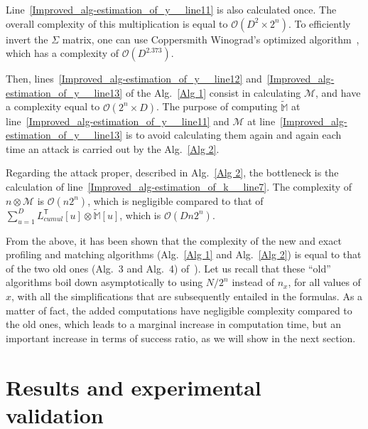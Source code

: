 \documentclass[conference,twocolumn]{IEEEtran}
\begin{document}
Line~\ref{Improved_alg-estimation_of_y__line11} is also calculated once. The overall complexity of this multiplication is equal to $ \mathcal{O} (D^2 \times 2^n)$. 
To efficiently invert the $\Sigma$ matrix, one can use Coppersmith Winograd's optimized algorithm~\cite{karloff2012proceedings}, which has a complexity of $\mathcal{O} (D^{2.373})$. %

Then, lines~\ref{Improved_alg-estimation_of_y__line12} and~\ref{Improved_alg-estimation_of_y__line13} of the Alg.~\ref{Alg 1} consist in calculating $\mathcal{M}$, and have a complexity equal to $\mathcal{O} (2^n \times D)$.
The purpose of computing
$\tilde{\mathbb{M}}$ at line~\ref{Improved_alg-estimation_of_y__line11} and
$\mathcal{M}$ at line~\ref{Improved_alg-estimation_of_y__line13} is to avoid calculating them again and again each time an attack is carried out by the Alg.~\ref{Alg 2}.

Regarding the attack proper, described in Alg.~\ref{Alg 2}, the bottleneck is the calculation of line~\ref{Improved_alg-estimation_of_k__line7}. The complexity of $n \otimes \mathcal{M}$ is $\mathcal{O}(n2^n)$, which is negligible compared to that of $\sum_{u=1}^{D} L_{cumul}^\mathsf{T}[u] \otimes\tilde{\mathbb{M}}[u]$, which is $\mathcal{O}(Dn2^n)$.
 
 From the above, it has been shown that the complexity of the new and exact profiling and matching algorithms (Alg.~\ref{Alg 1} and Alg.~\ref{Alg 2}) is equal to that of the two old ones (Alg.~3 and Alg.~4) of~\cite{OULADJ2019}). 
 Let us recall that these ``old'' algorithms boil down asymptotically to using $N/2^n$ instead of $n_x$, for all values of $x$, with all the simplifications that are subsequently entailed in the formulas. %
 As a matter of fact, the added computations have negligible complexity compared to the old ones, which leads to a marginal increase in computation time, but an important increase in terms of success ratio, as we will show in the next section.

 \section{Results and experimental validation}\label{sec-experimental}
\end{document}

